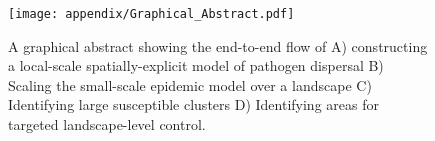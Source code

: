 \newpage

\begin{figure}
    \centering
    \texttt{[image: appendix/Graphical\_Abstract.pdf]}
    \caption{A graphical abstract showing the end-to-end flow of 
    A) constructing a local-scale spatially-explicit model of pathogen dispersal 
    B) Scaling the small-scale epidemic model over a landscape 
    C) Identifying large susceptible clusters 
    D) Identifying areas for targeted landscape-level control.}
    \label{fig:my_label}
\end{figure}



